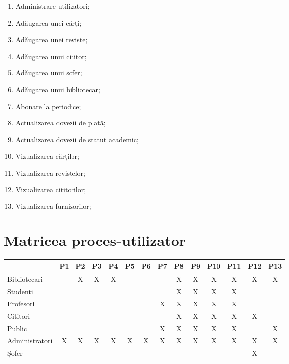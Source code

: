 \begin{enumerate}[(P1)]
\item Administrare utilizatori;
\item Adăugarea unei cărți;
\item Adăugarea unei reviste;
\item Adăugarea unui cititor;
\item Adăugarea unui șofer;
\item Adăugarea unui bibliotecar;
\item Abonare la periodice;
\item Actualizarea dovezii de plată;
\item Actualizarea dovezii de statut academic;
\item Vizualizarea cărților;
\item Vizualizarea revistelor;
\item Vizualizarea cititorilor;
\item Vizualizarea furnizorilor;
\end{enumerate}



\section{Matricea proces-utilizator}
\label{sec:matrice-pu}

\begin{center}
  \small
  \begin{tabular}{|l|c|c|c|c|c|c|c|c|c|c|c|c|c|}
    \hline
    & P1 & P2 & P3 & P4 & P5 & P6 & P7 & P8 & P9 & P10 & P11 & P12 & P13\\
    \hline \hline
    Bibliotecari & & X & X & X & & & & X & X & X & X & X & X \\
    \hline
    Studenți & & & & & & & & X & X & X & X & & \\
    \hline
    Profesori & & & & & & & X & X & X & X & X & & \\
    \hline
    Cititori & & & & & & & & X & X & X & X & X & \\
    \hline
    Public & & & & & & & X & X & X & X & X & & X \\
    \hline
    Administratori & X & X & X & X & X & X & X & X & X & X & X & X & X\\
    \hline
    Șofer & & & & & & & & & & & & X & \\
    \hline
  \end{tabular}
\end{center}

